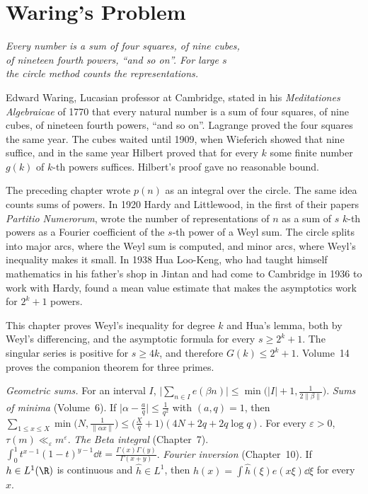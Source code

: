 \chapter{Waring's Problem}
\begin{center}\itshape
Every number is a sum of four squares, of nine cubes,\\
of nineteen fourth powers, ``and so on''. For large $s$\\
the circle method counts the representations.
\end{center}

Edward Waring, Lucasian professor at Cambridge, stated in his \emph{Meditationes Algebraicae} of 1770 that every natural number is a sum of four squares, of nine cubes, of nineteen fourth powers, ``and so on''. Lagrange proved the four squares the same year. The cubes waited until 1909, when Wieferich showed that nine suffice, and in the same year Hilbert proved that for every $k$ some finite number $g(k)$ of $k$-th powers suffices. Hilbert's proof gave no reasonable bound.

The preceding chapter wrote $p(n)$ as an integral over the circle. The same idea counts sums of powers. In 1920 Hardy and Littlewood, in the first of their papers \emph{Partitio Numerorum}, wrote the number of representations of $n$ as a sum of $s$ $k$-th powers as a Fourier coefficient of the $s$-th power of a Weyl sum. The circle splits into major arcs, where the Weyl sum is computed, and minor arcs, where Weyl's inequality makes it small. In 1938 Hua Loo-Keng, who had taught himself mathematics in his father's shop in Jintan and had come to Cambridge in 1936 to work with Hardy, found a mean value estimate that makes the asymptotics work for $2^k+1$ powers.

This chapter proves Weyl's inequality for degree $k$ and Hua's lemma, both by Weyl's differencing, and the asymptotic formula for every $s\ge 2^k+1$. The singular series is positive for $s\ge 4k$, and therefore $G(k)\le 2^k+1$. Volume~14 proves the companion theorem for three primes.

\begin{reminder}
\emph{Geometric sums.} For an interval $I$, $\bigl|\sum_{n\in I}e(\beta n)\bigr|\le\min\bigl(|I|+1,\frac1{2\|\beta\|}\bigr)$.
\emph{Sums of minima} (Volume~6). If $\bigl|\alpha-\frac aq\bigr|\le\frac1{q^2}$ with $(a,q)=1$, then $\sum_{1\le x\le X}\min\bigl(N,\frac1{\|\alpha x\|}\bigr)\le\bigl(\frac Xq+1\bigr)(4N+2q+2q\log q)$. For every $\varepsilon>0$, $\tau(m)\ll_\varepsilon m^\varepsilon$.
\emph{The Beta integral} (Chapter~7). $\int_0^1 t^{x-1}(1-t)^{y-1}\dd t=\frac{\Gamma(x)\Gamma(y)}{\Gamma(x+y)}$.
\emph{Fourier inversion} (Chapter~10). If $h\in L^1(\R)$ is continuous and $\hat h\in L^1$, then $h(x)=\int\hat h(\xi)e(x\xi)\dd\xi$ for every $x$.
\end{reminder}

